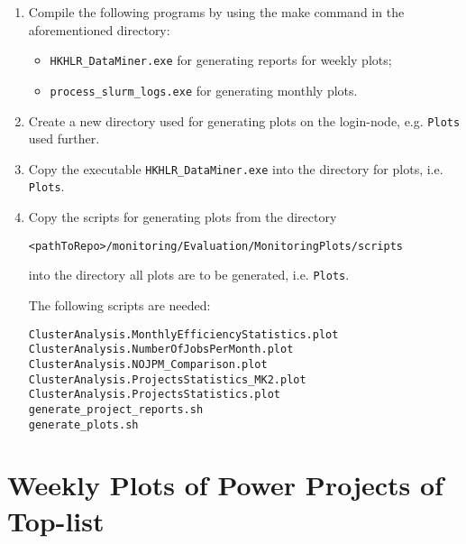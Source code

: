 \documentclass[12pt,a4paper,onecolumn]{article}
\begin{document}
\begin{enumerate}
\item Compile the following programs by using the make command in the aforementioned directory:
\begin{itemize}
  \item \lstinline{HKHLR_DataMiner.exe} for generating reports for weekly plots;
  \item \lstinline{process_slurm_logs.exe} for generating  monthly plots.
\end{itemize}

\item Create a new directory used for generating plots on the login-node, e.g. \lstinline{Plots} used further.

\item Copy the executable \lstinline{HKHLR_DataMiner.exe} into the directory for plots, i.e. \lstinline{Plots}.

\item Copy the scripts for generating plots from the directory
\begin{lstlisting}
<pathToRepo>/monitoring/Evaluation/MonitoringPlots/scripts
\end{lstlisting}
into the directory all plots are to be generated, i.e. \lstinline{Plots}.

The following scripts are needed:
\begin{lstlisting}
ClusterAnalysis.MonthlyEfficiencyStatistics.plot
ClusterAnalysis.NumberOfJobsPerMonth.plot
ClusterAnalysis.NOJPM_Comparison.plot
ClusterAnalysis.ProjectsStatistics_MK2.plot
ClusterAnalysis.ProjectsStatistics.plot
generate_project_reports.sh
generate_plots.sh
\end{lstlisting}

\end{enumerate}


\section{Weekly Plots of Power Projects of Top-list}
\label{sec:weekly_plots_top_power_projects}

\end{document}
